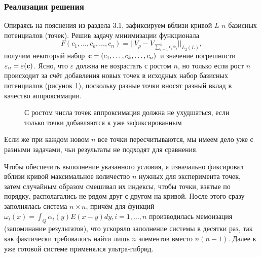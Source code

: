 \documentclass[a4paper]{article}
\newcommand{\V}[1]{\int_Q #1(y) E(x-y) dy}
\begin{document}
\subsubsection{Реализация решения}
Опираясь на пояснения из раздела 3.1, зафиксируем вблизи кривой $L$ $n$ базисных потенциалов (точек).
Решив задачу минимизации функционала
\begin{equation*}
  F(c_1,\dots,c_k,\dots,c_n)=||V_{\rho}-V_{\sum_{i=1}^n c_i \alpha_i}||_{L_2(L)},
\end{equation*}
получим некоторый набор ${\bf c}=(c_1,\dots,c_k,\dots,c_n)$ и значение погрешности $\varepsilon_n = \varepsilon ({\bf c})$.
Ясно, что $\varepsilon$ должна не возрастать с ростом $n$, но только если рост $n$ происходит за счёт добавления новых точек в исходных набор базисных потенциалов (рисунок \ref{points2}),
поскольку разные точки вносят разный вклад в качество аппроксимации.
\begin{figure}[h!]
  \noindent{}
   \caption{С ростом числа точек аппроксимация должна не ухудшаться, если только точки добавляются к уже зафиксированным}   
  \label{points2}
\end{figure}

Если же при каждом новом $n$ все точки пересчитываются, мы имеем дело уже с разными задачами, чьи результаты не подходят для сравнения.

Чтобы обеспечить выполнение указанного условия, я изначально фиксировал вблизи кривой максимальное количество $n$ нужных для эксперимента точек,
затем случайным образом смешивал их индексы, чтобы точки, взятые по порядку, располагались не рядом друг с другом на кривой.
После этого сразу заполнялась система $n \times n$, причём для функций $\omega_i(x) =\V{\alpha_i}, i=1,\dots,n$ производилась мемоизация (запоминание результатов), что ускоряло заполнение системы в десятки раз, так как
фактически требовалось найти лишь $n$ элементов вместо $n(n-1)$.
Далее к уже готовой системе применялся ультра-гибрид.
\end{document}
